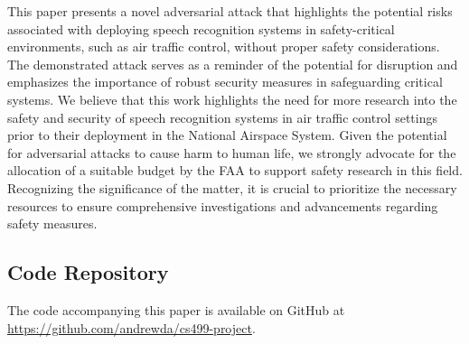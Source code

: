 \documentclass[11pt,a4paper]{article}
\begin{document}
This paper presents a novel adversarial attack that highlights the potential
risks associated with deploying speech recognition systems in safety-critical
environments, such as air traffic control, without proper safety considerations.
The demonstrated attack serves as a reminder of the potential for disruption and
emphasizes the importance of robust security measures in safeguarding critical
systems. We believe that this work highlights the need for more research into
the safety and security of speech recognition systems in air traffic control
settings prior to their deployment in the National Airspace System. Given the
potential for adversarial attacks to cause harm to human life, we strongly
advocate for the allocation of a suitable budget by the FAA to support safety
research in this field. Recognizing the significance of the matter, it is
crucial to prioritize the necessary resources to ensure comprehensive
investigations and advancements regarding safety measures.

\subsection{Code Repository}

The code accompanying this paper is available on GitHub at
\url{https://github.com/andrewda/cs499-project}.


\end{document}
